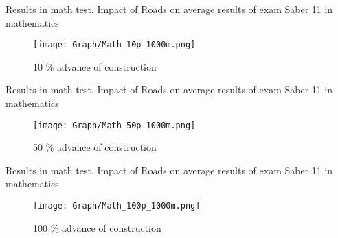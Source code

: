\documentclass[9pt]{beamer}
\begin{document}
         




\begin{frame}{Results in math test. \hyperlink{result_math}{}} \label{10p_math}
Impact of Roads on average results of exam Saber 11 in mathematics
\begin{figure}
  \centering
  \texttt{[image: Graph/Math\_10p\_1000m.png]} 
  \caption{\small 10 \% advance of construction}
  \label{fig:6.1sub-first}
\end{figure}

\end{frame}
\begin{frame}{Results in math test. \hyperlink{result_math}{}} \label{50p_math}
Impact of Roads on average results of exam Saber 11 in mathematics
\begin{figure}
  \centering
  \texttt{[image: Graph/Math\_50p\_1000m.png]} 
  \caption{\small 50 \% advance of construction}
  \label{fig:6.1sub-first}
\end{figure}

\end{frame}
\begin{frame}{Results in math test. \hyperlink{result_math}{} } \label{100p_math}
Impact of Roads on average results of exam Saber 11 in mathematics
\begin{figure}
  \centering
  \texttt{[image: Graph/Math\_100p\_1000m.png]} 
  \caption{\small 100 \% advance of construction}
 
\end{figure}

\end{frame}
\end{document}

